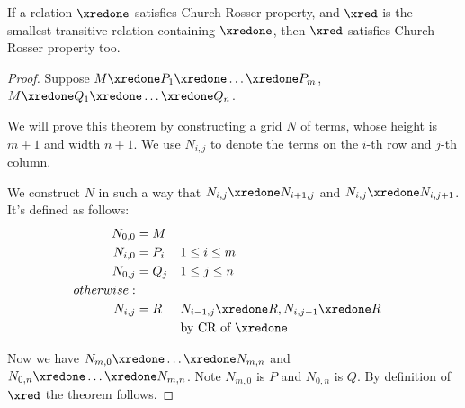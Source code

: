 \documentclass[../../../include/open-logic-section]{subfiles}
\begin{document}
\begin{thm} 
  If a relation $\xredone$ satisfies Church-Rosser property, and $\xred$ is the
  smallest transitive relation containing $\xredone$, then $\xred$ satisfies
  Church-Rosser property too.
\end{thm}
\begin{proof}
  Suppose $M \xredone P_1 \xredone \ldots \xredone P_m$, $M \xredone Q_1
  \xredone \ldots \xredone Q_n$.
  
  We will prove this theorem by constructing a grid $N$ of terms, whose height is $m + 1$ and width $n + 1$. We use $N_{i,j}$ to denote the terms
  on the $i$-th row and $j$-th column.
  
  We construct $N$ in such a way that $N_{i,j} \xredone N_{i+1,j}$ and
  $N_{i,j} \xredone N_{i,j+1}$. It's defined as follows:
  \begin{align*}
    N_{0,0} &= M \\
    N_{i,0} &= P_i && 1 \le i \le m \\
    N_{0,j} &= Q_j && 1 \le j \le n \\
    otherwise: & \\
    N_{i,j} &= R && N_{i-1,j} \xredone R, N_{i,j-1} \xredone R \\
            & && \text{by CR of $\xredone$}
  \end{align*}

  Now we have $N_{m,0} \xredone \ldots \xredone N_{m,n}$ and $N_{0,n}
  \xredone \ldots \xredone N_{m,n}$. Note $N_{m,0}$ is $P$ and $N_{0,n}$
  is $Q$. By definition of $\xred$ the theorem follows.
\end{proof}
\end{document}

